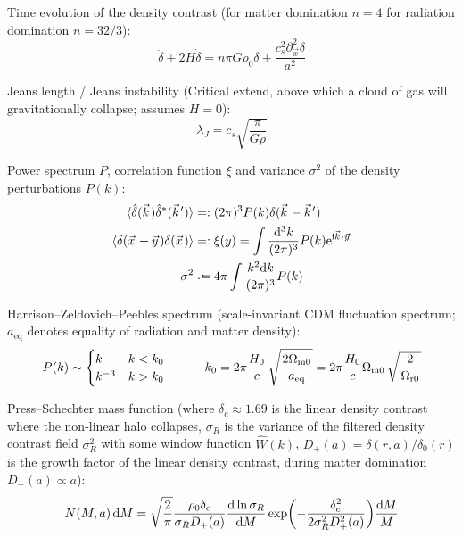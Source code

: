 		\noindent
		Time evolution of the density contrast (for matter domination $n=4$ for radiation domination $n=32/3$):
		\begin{equation}
			\ddot{\delta} + 2 H \dot{\delta} = n \pi G \rho_0 \delta + \frac{c_s^2 \partial_{\vec{x}}^2 \delta}{a^2}
		\end{equation}

		\noindent
		Jeans length / Jeans instability (Critical extend, above which a cloud of gas will gravitationally collapse; assumes $H=0$):
		\begin{equation}
			\lambda_J = c_s \sqrt{\frac{\pi}{G \rho}}
		\end{equation}

		\noindent
		Power spectrum $P$, correlation function $\xi$ and variance $\sigma^2$ of the density perturbations $P(k)$:
		\begin{align}
			\avg{\hat{\delta}(\vec{k}) \hat{\delta}^{*}(\vec{k}')} &=: (2\pi)^3 P(k) \delta (\vec{k}-\vec{k}') \\
			\avg{\delta(\vec{x} + \vec{y}) \delta(\vec{x})} &=: \xi(y) = \int \frac{\dd[3]k}{(2\pi)^3} P(k) \ex^{\i \vec{k} \cdot \vec{y}}\\
			\sigma^2 &\defeq 4\pi\int \frac{k^2 \dd k}{(2 \pi)^3} P(k)
		\end{align}

		\noindent
		Harrison--Zeldovich--Peebles spectrum (scale-invariant CDM fluctuation spectrum; $a_{\text{eq}}$ denotes equality of radiation and matter density):
		\begin{equation}
			P(k) \sim
			\begin{cases}
				k & k < k_0\\
				k^{-3} & k > k_0
			\end{cases}
			\hspace{30pt}
			k_0 = 2\pi{\frac{H_{0}}{c}}\,{\sqrt{\frac{2\Omega_{\mathrm{m0}}}{a_{\mathrm{eq}}}}}=2\pi{\frac{H_{0}}{c}}\Omega_{\mathrm{m0}}\,{\sqrt{\frac{2}{\Omega_{\mathrm{r0}}}}}
		\end{equation}

		\noindent
		Press--Schechter mass function (where $\delta_c \approx 1.69$ is the linear density contrast where the non-linear halo collapses, $\sigma_R$ is the variance of the filtered density contrast field $\sigma_R^2$ with some window function $\hat{W}(k)$, $D_+(a) = \delta(r,a)/\delta_0(r)$ is the growth factor of the linear density contrast, during matter domination $D_+(a) \propto a$):
		\begin{equation}
			N(M,a) \dd{M} = \sqrt{\frac{2}{\pi}} \frac{\rho_0 \delta_c}{\sigma_R D_{+}(a)} \dv{\ln\sigma_R}{M} \exp(-\frac{\delta_c^2}{2 \sigma_R^2 D_{+}^2(a)}) \frac{\dd M}{M}
		\end{equation}

